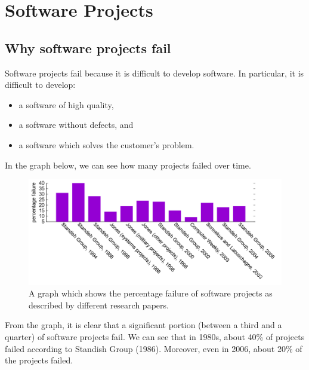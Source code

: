 \documentclass[a4paper, openany]{memoir}
\begin{document}
\chapter{Software Projects}
\section{Why software projects fail}
Software projects fail because it is difficult to develop software. In particular, it is difficult to develop:
\begin{itemize}
    \item a software of high quality,
    \item a software without defects, and
    \item a software which solves the customer's problem.
\end{itemize}

In the graph below, we can see how many projects failed over time.
\begin{figure}[H]
    \centering
    \includegraphics[scale=0.28]{src/1.1 NumberOfFailuresGraph.png}
    \caption{A graph which shows the percentage failure of software projects as described by different research papers.}
\end{figure}
\noindent From the graph, it is clear that a significant portion (between a third and a quarter) of software projects fail. We can see that in 1980s, about 40\% of projects failed according to Standish Group (1986). Moreover, even in 2006, about 20\% of the projects failed. 
\end{document}
